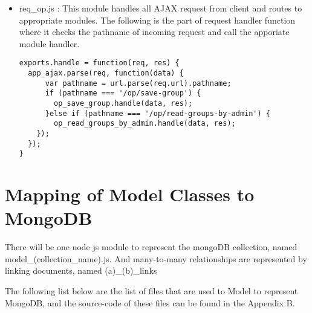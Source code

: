 \begin{itemize}
\item req{\_}op.js : This module handles all AJAX request from client and routes to appropriate modules. The following is the part of request handler function where it checks the pathname of incoming request and call the apporiate module handler.

\begin{lstlisting}
exports.handle = function(req, res) {
  app_ajax.parse(req, function(data) {
      var pathname = url.parse(req.url).pathname;
      if (pathname === '/op/save-group') {
        op_save_group.handle(data, res);
      }else if (pathname === '/op/read-groups-by-admin') {
        op_read_groups_by_admin.handle(data, res);
    });
  });
}
\end{lstlisting}
 
\end{itemize}

\section{Mapping of Model Classes to MongoDB}
There will be one node js module to represent the mongoDB collection, named model{\_}(collection{\_}name).js. And many-to-many relationships are represented by linking documents, named (a){\_}(b){\_}links

The following list below are the list of files that are used to Model to represent MongoDB, and the source-code of these files can be found in the Appendix B.

